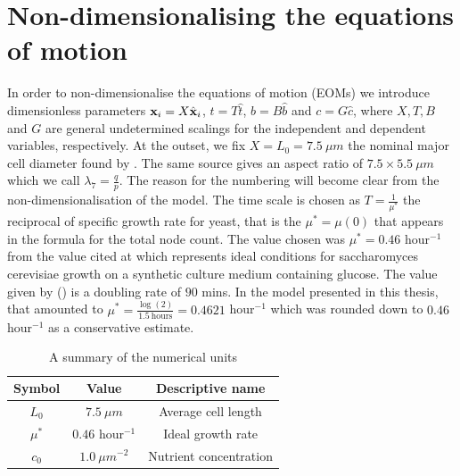 \section{Non-dimensionalising the equations of motion}\label{sec:nonDimEOMs}

In order to non-dimensionalise the equations of motion (EOMs) we
introduce dimensionless parameters $\vb{x}_i = X\hat{\vb{x}}_i$, $t = T \hat{t}$, $b = B \hat{b}$
and $c = G \hat{c}$, where $X, T, B$ and $G$ are general undetermined scalings for the independent 
and dependent variables, respectively. At the outset, we fix $X = L_0 = 7.5 \ \mu m$ the nominal major cell diameter
found by \cite{chavez2024cell}. The same source gives an aspect ratio
of $7.5 \times 5.5 \ \mu m$ which we call $\lambda_7 = \frac{q}{p}$. The reason for the numbering 
will become clear from the non-dimensionalisation of the model. The time scale is chosen as
$T = \frac{1}{\mu^*}$ the reciprocal of specific growth rate for yeast, that is the $\mu^* = \mu(0)$ that appears in
the formula for the total node count. The value chosen was $\mu^* = 0.46$ hour$^{-1}$
from the value cited at \cite{salari2017investigation} which represents ideal conditions
for saccharomyces cerevisiae growth on a synthetic culture medium containing glucose. 
The value given by (\cite{salari2017investigation}) is a doubling rate of $90$ mins. In the model
presented in this thesis, that amounted to $\mu^* = \frac{\log(2)}{1.5 \ \textrm{hours}} = 0.4621$ hour$^{-1}$ which
was rounded down to $0.46$ hour$^{-1}$ as a conservative estimate.

\begin{table}[!htb]
\begin{center}
    \begin{tabular}{ |c|c|c| } 
     \hline
      \textbf{Symbol} & \textbf{Value} & \textbf{Descriptive name} \\ 
      \hline
     $L_0$   & $7.5 \ \mu m$       & Average cell length \\ 
     $\mu^*$ & $0.46$ hour$^{-1}$   & Ideal growth rate  \\ 
     $c_0$   & $1.0 \ \mu m^{-2}$  & Nutrient concentration \\ 
     \hline
     
    \end{tabular}
    
\end{center}
\caption{A summary of the numerical units}
\label{table:NumericalUnits}
\end{table}

